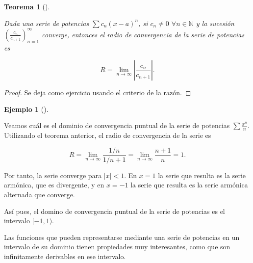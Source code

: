 \documentclass[
  a4paper,
]{scrreport}
\theoremstyle{definition}
\newtheorem{example}{Ejemplo}[chapter]
\theoremstyle{plain}
\theoremstyle{definition}
\theoremstyle{definition}
\theoremstyle{plain}
\newtheorem{theorem}{Teorema}[chapter]
\theoremstyle{plain}
\theoremstyle{remark}
\begin{document}
\begin{theorem}[]\protect\hypertarget{thm-radio-convergencia-razon}{}\label{thm-radio-convergencia-razon}

Dada una serie de potencias \(\sum c_n(x-a)^n\), si \(c_n\neq 0\)
\(\forall n\in\mathbb{N}\) y la sucesión
\(\left(\frac{c_n}{c_{n+1}}\right)_{n=1}^\infty\) converge, entonces el
radio de convergencia de la serie de potencias es

\[
R = \lim_{n\to\infty} \left|\frac{c_n}{c_{n+1}}\right|.
\]

\end{theorem}

\begin{tcolorbox}[enhanced jigsaw, leftrule=.75mm, colbacktitle=quarto-callout-note-color!10!white, toprule=.15mm, opacityback=0, opacitybacktitle=0.6, toptitle=1mm, breakable, bottomtitle=1mm, colframe=quarto-callout-note-color-frame, rightrule=.15mm, titlerule=0mm, title=\textcolor{quarto-callout-note-color}{\faInfo}\hspace{0.5em}{Demostración}, arc=.35mm, left=2mm, bottomrule=.15mm, colback=white, coltitle=black]

\begin{proof}
Se deja como ejercicio usando el criterio de la razón.
\end{proof}

\end{tcolorbox}

\begin{example}[]\protect\hypertarget{exm-radio-convergencia-razon}{}\label{exm-radio-convergencia-razon}

Veamos cuál es el dominio de convergencia puntual de la serie de
potencias \(\sum \frac{x^n}{n}\). Utilizando el teorema anterior, el
radio de convergencia de la serie es

\[
R = \lim_{n\to\infty} \frac{1/n}{1/n+1} = \lim_{n\to\infty} \frac{n+1}{n} = 1.
\]

Por tanto, la serie converge para \(|x|<1\). En \(x=1\) la serie que
resulta es la serie armónica, que es divergente, y en \(x=-1\) la serie
que resulta es la serie armónica alternada que converge.

Así pues, el domino de convergencia puntual de la serie de potencias es
el intervalo \([-1,1)\).

\end{example}

Las funciones que pueden representarse mediante una serie de potencias
en un intervalo de su dominio tienen propiedades muy interesantes, como
que son infinitamente derivables en ese intervalo.
\end{document}

